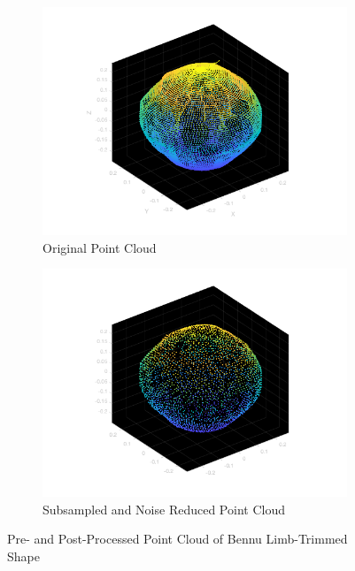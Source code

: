 \begin{figure}[h!]
    \centering
    \begin{subfigure}[t]{0.5\textwidth}
        \centering
        \includegraphics[width = \textwidth]{fig/dense_bennu.png}
        \caption{Original Point Cloud}
    \end{subfigure}%
    \begin{subfigure}[t]{0.5\textwidth}
        \centering
        \includegraphics[width = \textwidth]{fig/sparse_bennu.png}
        \caption{Subsampled and Noise Reduced Point Cloud}
    \end{subfigure}
    \caption{Pre- and Post-Processed Point Cloud of Bennu Limb-Trimmed Shape}
\end{figure}

